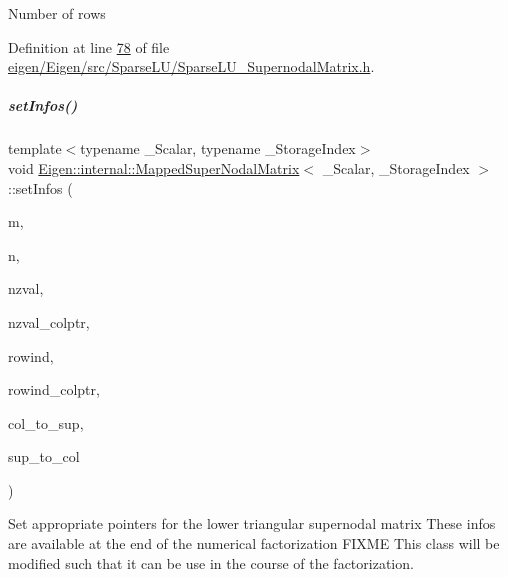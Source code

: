 Number of rows 

Definition at line \hyperlink{eigen_2_eigen_2src_2_sparse_l_u_2_sparse_l_u___supernodal_matrix_8h_source_l00078}{78} of file \hyperlink{eigen_2_eigen_2src_2_sparse_l_u_2_sparse_l_u___supernodal_matrix_8h_source}{eigen/\+Eigen/src/\+Sparse\+L\+U/\+Sparse\+L\+U\+\_\+\+Supernodal\+Matrix.\+h}.

\mbox{\label{group___sparse_l_u___module_af1427486564e2c75b9da68f98bd04e63}} 
\subparagraph{\texorpdfstring{set\+Infos()}{setInfos()}\hspace{0.1cm}{\footnotesize\ttfamily [1/2]}}
{\footnotesize\ttfamily template$<$typename \+\_\+\+Scalar, typename \+\_\+\+Storage\+Index$>$ \\
void \hyperlink{group___sparse_l_u___module_class_eigen_1_1internal_1_1_mapped_super_nodal_matrix}{Eigen\+::internal\+::\+Mapped\+Super\+Nodal\+Matrix}$<$ \+\_\+\+Scalar, \+\_\+\+Storage\+Index $>$\+::set\+Infos (\begin{DoxyParamCaption}\item[{\hyperlink{namespace_eigen_a62e77e0933482dafde8fe197d9a2cfde}{Index}}]{m,  }\item[{\hyperlink{namespace_eigen_a62e77e0933482dafde8fe197d9a2cfde}{Index}}]{n,  }\item[{\hyperlink{group___core___module}{Scalar\+Vector} \&}]{nzval,  }\item[{\hyperlink{group___core___module}{Index\+Vector} \&}]{nzval\+\_\+colptr,  }\item[{\hyperlink{group___core___module}{Index\+Vector} \&}]{rowind,  }\item[{\hyperlink{group___core___module}{Index\+Vector} \&}]{rowind\+\_\+colptr,  }\item[{\hyperlink{group___core___module}{Index\+Vector} \&}]{col\+\_\+to\+\_\+sup,  }\item[{\hyperlink{group___core___module}{Index\+Vector} \&}]{sup\+\_\+to\+\_\+col }\end{DoxyParamCaption})\hspace{0.3cm}{\ttfamily [inline]}}

Set appropriate pointers for the lower triangular supernodal matrix These infos are available at the end of the numerical factorization F\+I\+X\+ME This class will be modified such that it can be use in the course of the factorization. 

